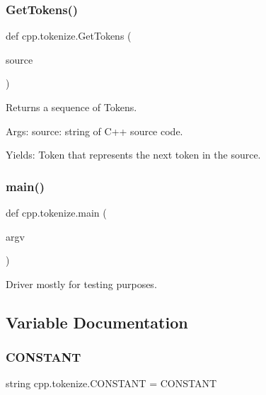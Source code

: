 \subsubsection{\texorpdfstring{GetTokens()}{GetTokens()}}
{\footnotesize\ttfamily def cpp.\+tokenize.\+Get\+Tokens (\begin{DoxyParamCaption}\item[{}]{source }\end{DoxyParamCaption})}

\begin{DoxyVerb}Returns a sequence of Tokens.

Args:
  source: string of C++ source code.

Yields:
  Token that represents the next token in the source.
\end{DoxyVerb}
 \mbox{\label{namespacecpp_1_1tokenize_ae666c331b4bd7d1f3e8956c78cc6f3a4}} 
\subsubsection{\texorpdfstring{main()}{main()}}
{\footnotesize\ttfamily def cpp.\+tokenize.\+main (\begin{DoxyParamCaption}\item[{}]{argv }\end{DoxyParamCaption})}

\begin{DoxyVerb}Driver mostly for testing purposes.\end{DoxyVerb}
 

\subsection{Variable Documentation}
\mbox{\label{namespacecpp_1_1tokenize_a5e3bf1014a301906871113a989188a78}} 
\subsubsection{\texorpdfstring{CONSTANT}{CONSTANT}}
{\footnotesize\ttfamily string cpp.\+tokenize.\+C\+O\+N\+S\+T\+A\+NT = \textquotesingle{}C\+O\+N\+S\+T\+A\+NT\textquotesingle{}}

\mbox{\label{namespacecpp_1_1tokenize_a8b45b0f0f2b504757e9ede9c342b2c36}} 
